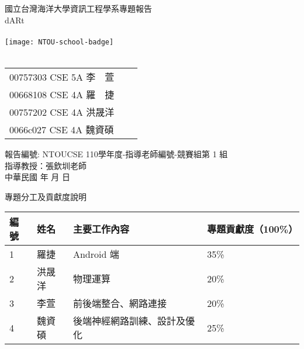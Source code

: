\documentclass[12pt, a4paper]{report}
\begin{document}
\begin{titlepage}
    \linespread{2} %
    \centering
    \Large 國立台灣海洋大學資訊工程學系專題報告\\
    \LARGE dARt \\
    \ \\
    \texttt{[image: NTOU-school-badge]}\\

    \ \\
    \linespread{1}
    \begin{table}[h]
        \large
        \centering
        \begin{tabular}{lll}
            00757303 CSE 5A 李　萱 \\
            00668108 CSE 4A 羅　捷 \\
            00757202 CSE 4A 洪晟洋 \\
            0066c027 CSE 4A 魏資碩 \\
        \end{tabular}
    \end{table}

    \large \hspace{-1cm} 報告編號: NTOUCSE 110學年度-指導老師編號-競賽組第 1 組 \\
    \large 指導教授：張欽圳老師\ \\
    \vspace{3cm}
    \large 中華民國 {\the\numexpr{}} 年 \the\month 月 \the\day 日

\end{titlepage}

\begin{large}
\centering 專題分工及貢獻度說明
\end{large}

\begin{table}[h]
\begin{tabular}{|l|l|l|l|}
\hline
編號 & 姓名  & 主要工作內容     & 專題貢獻度（100\%） \\\hline
1  & 羅捷  & Android 端 &        35\%      \\\hline
2  & 洪晟洋 &  物理運算  &      20\%        \\\hline
3  & 李萱  & 前後端整合、網路連接 &    20\%          \\\hline
4  & 魏資碩 & 後端神經網路訓練、設計及優化 &  25\%     \\\hline     
\end{tabular}
\end{table}

\tableofcontents %
\listoffigures
\lstlistoflistings











\end{document}
